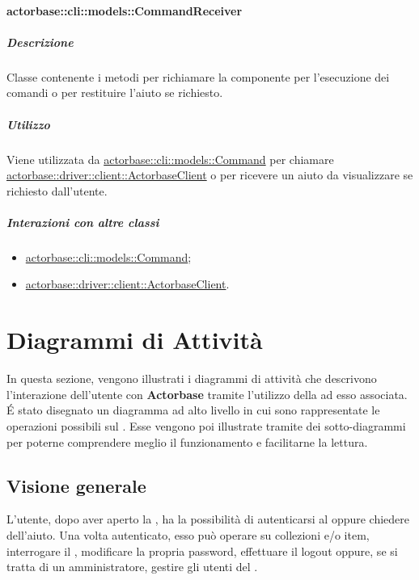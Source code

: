 \documentclass{scalatekids-article}
\begin{document}
\paragraph{actorbase::cli::models::CommandReceiver}
\label{sec:actorbase::cli::models::CommandReceiver}

\subparagraph{Descrizione}

Classe contenente i metodi per richiamare la componente  per
l'esecuzione dei comandi o per restituire l'aiuto se richiesto.

\subparagraph{Utilizzo}

Viene utilizzata da \hyperref[sec:actorbase::cli::models::Command]{actorbase::cli::models::Command} per chiamare
\hyperref[sec:actorbase::driver::client::ActorbaseClient]{actorbase::driver::client::ActorbaseClient} o per ricevere un aiuto da
visualizzare se richiesto dall'utente.

\subparagraph{Interazioni con altre classi}

\begin{itemize}
\item \hyperref[sec:actorbase::cli::models::Command]{actorbase::cli::models::Command};
\item \hyperref[sec:actorbase::driver::client::ActorbaseClient]{actorbase::driver::client::ActorbaseClient}.
\end{itemize}

\section{Diagrammi di Attività}

In questa sezione, vengono illustrati i diagrammi di attività che descrivono
l'interazione dell'utente con \textbf{Actorbase} tramite l'utilizzo della 
ad esso associata.  É stato disegnato un diagramma ad alto livello in cui sono
rappresentate le operazioni possibili sul . Esse vengono poi
illustrate tramite dei sotto-diagrammi per poterne comprendere meglio il
funzionamento e facilitarne la lettura.

\subsection{Visione generale}

L'utente, dopo aver aperto la , ha la possibilità di autenticarsi
al  oppure chiedere dell'aiuto. Una volta autenticato, esso può
operare su collezioni e/o item, interrogare il , modificare la propria
password, effettuare il logout oppure, se si tratta di un amministratore,
gestire gli utenti del .
\end{document}
